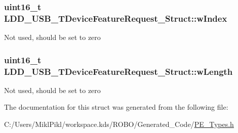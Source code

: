 \subsubsection[{w\+Index}]{\setlength{\rightskip}{0pt plus 5cm}uint16\+\_\+t L\+D\+D\+\_\+\+U\+S\+B\+\_\+\+T\+Device\+Feature\+Request\+\_\+\+Struct\+::w\+Index}\label{struct_l_d_d___u_s_b___t_device_feature_request___struct_a261267b70741fe26898665df42fec10b}
Not used, should be set to zero \hypertarget{struct_l_d_d___u_s_b___t_device_feature_request___struct_af0c222aa4585a132b2582fb1c290edc7}{}
\subsubsection[{w\+Length}]{\setlength{\rightskip}{0pt plus 5cm}uint16\+\_\+t L\+D\+D\+\_\+\+U\+S\+B\+\_\+\+T\+Device\+Feature\+Request\+\_\+\+Struct\+::w\+Length}\label{struct_l_d_d___u_s_b___t_device_feature_request___struct_af0c222aa4585a132b2582fb1c290edc7}
Not used, should be set to zero 

The documentation for this struct was generated from the following file\+:\begin{DoxyCompactItemize}
\item 
C\+:/\+Users/\+Mikl\+Pikl/workspace.\+kds/\+R\+O\+B\+O/\+Generated\+\_\+\+Code/\hyperlink{_p_e___types_8h}{P\+E\+\_\+\+Types.\+h}\end{DoxyCompactItemize}
